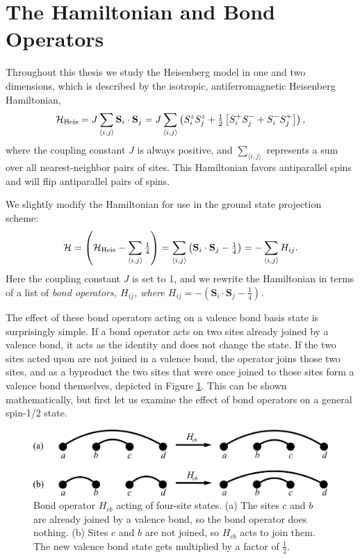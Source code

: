\section{The Hamiltonian and Bond Operators}
Throughout this thesis we study the Heisenberg model in one and two dimensions, which is
described by the isotropic, antiferromagnetic Heisenberg Hamiltonian,
\begin{equation}
\mathcal{H}_{\rm{Heis}}=J\sum_{\langle i,j \rangle} \mathbf{S}_i\cdot \mathbf{S}_j
= J\sum_{\langle i,j \rangle}
	\left( S_i^z S_j^z + \tfrac{1}{2}\left[ S_i^+ S_j^- + S_i^- S_j^+ \right]\right),
\end{equation}
where the coupling constant $J$ is always positive, and $\sum_{\langle i,j \rangle}$ 
represents a sum over all nearest-neighbor pairs of sites.  
This Hamiltonian favors antiparallel spins and will flip antiparallel pairs of spins.

We slightly modify the Hamiltonian for use in the ground state projection scheme:
\begin{equation}
\mathcal{H}= \left(\mathcal{H}_{\rm{Heis}} - \sum_{\langle i,j \rangle} \tfrac{1}{4} \right)= \sum_{\langle i,j \rangle} 
	\left(\mathbf{S}_i\cdot \mathbf{S}_j - \tfrac{1}{4}\right)
	= - \sum_{\langle i,j \rangle} H_{ij}.
\label{hammm}
\end{equation}
Here the coupling constant $J$ is set to 1, and we rewrite the Hamiltonian in terms of a list of
\it{bond operators}, \rm $H_{ij}$, where 
$H_{ij}=-\left(\mathbf{S}_i\cdot \mathbf{S}_j - \tfrac{1}{4}\right)$.

The effect of these bond operators acting on a valence bond basis state is 
surprisingly simple.  If a bond operator acts on two sites already joined by a valence
bond, it acts as the identity and does not change the state.  If the two sites acted upon are 
not joined in a valence bond, the operator joins those two sites, and as a byproduct the 
two sites that were once joined to those sites form a valence bond themselves, depicted in Figure \ref{bopfig}.
This can be shown mathematically, but first let us examine the effect of bond operators
on a general spin-1/2 state.
\begin{figure}
\includegraphics[width=6.3in]{./figures/made/bop.pdf}
\caption[Bond operator acting on four-site states]{
	Bond operator $H_{cb}$ acting of four-site states.
	(a) The sites $c$ and $b$ are already joined by a valence bond, so the bond operator does nothing.
	(b) Sites $c$ and $b$ are not joined, so $H_{cb}$ acts to join them.  The new valence bond state gets multiplied by a factor of $\frac{1}{2}$. 
 \label{bopfig}
}
\end{figure}

